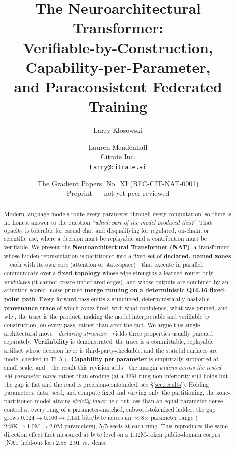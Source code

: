 \documentclass[11pt]{article}
\title{\textbf{The Neuroarchitectural Transformer:}\\[2pt]
Verifiable-by-Construction, Capability-per-Parameter,\\ and Paraconsistent Federated Training}
\author{Larry Klosowski \and Lauren Mendenhall\\ Citrate Inc.\\ \texttt{Larry@citrate.ai}}
\date{The Gradient Papers, No.~XI \quad (RFC-CIT-NAT-0001)\\ Preprint --- not yet peer reviewed}
\newcommand{\Qff}{Q16.16}
\begin{document}
\maketitle

\begin{abstract}
Modern language models route every parameter through every computation, so there is no honest
answer to the question \emph{``which part of the model produced this?''} That opacity is tolerable
for casual chat and disqualifying for regulated, on-chain, or scientific use, where a decision must
be replayable and a contribution must be verifiable. We present the \textbf{Neuroarchitectural
Transformer (NAT)}, a transformer whose hidden representation is partitioned into a fixed set of
\textbf{declared, named zones}---each with its own core (attention or state-space)---that execute in
parallel, communicate over a \textbf{fixed topology} whose edge strengths a learned router only
\emph{modulates} (it cannot create undeclared edges), and whose outputs are combined by an
attention-scored, noise-pruned \textbf{merge running on a deterministic \Qff{} fixed-point path}.
Every forward pass emits a structured, deterministically-hashable \textbf{provenance trace} of which
zones fired, with what confidence, what was pruned, and why; the trace is the product, making the
model interpretable and verifiable by construction, on every pass, rather than after the fact. We
argue this single architectural move---\emph{declaring structure}---yields three properties usually
pursued separately. \textbf{Verifiability} is demonstrated: the trace is a committable, replayable
artifact whose decision layer is third-party-checkable, and the stateful surfaces are model-checked
in TLA+. \textbf{Capability per parameter} is empirically supported at small scale, and---the result this
revision adds---the margin \emph{widens across the tested eM-parameter range} rather than eroding (at a 32M rung non-inferiority still holds but the gap is flat and the read is precision-confounded; see \S\ref{sec:results}). Holding parameters, data,
seed, and compute fixed and varying only the partitioning, the zone-partitioned model attains
\emph{strictly lower} held-out loss than an equal-parameter dense control at every rung of a
parameter-matched, subword-tokenized ladder: the gap grows $0.024 \to 0.106 \to 0.141$ bits/byte
across an $\approx$8$\times$ parameter range ($248\mathrm{K} \to 1.0\mathrm{M} \to 2.0\mathrm{M}$
parameters), $5/5$ seeds at each rung. This reproduces the same-direction effect first measured at
byte level on a 1.12M-token public-domain corpus (NAT held-out loss 2.88--2.91 vs.\ dense

\end{abstract}
\end{document}
